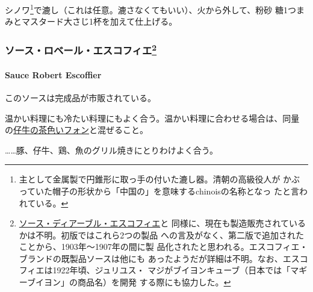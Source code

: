 シノワ\footnote{主として金属製で円錐形に取っ手の付いた漉し器。清朝の高級役人が
  かぶっていた帽子の形状から「中国の」を意味するchinoisの名称となっ
  たと言われている。}で漉し（これは任意。漉さなくてもいい）、火から外して、粉砂
糖1つまみとマスタード大さじ1杯を加えて仕上げる。

\maeaki

\hypertarget{ux30bdux30fcux30b9ux30edux30d9ux30fcux30ebux30a8ux30b9ux30b3ux30d5ux30a3ux30a879}{%
\subsubsection[ソース・ロベール・エスコフィエ]{\texorpdfstring{ソース・ロベール・エスコフィエ\footnote{\protect\hyperlink{sauce-diable-escoffier}{ソース・ディアーブル・エスコフィエ}と
  同様に、現在も製造販売されているかは不明。初版ではこれら2つの製品
  への言及がなく、第二版で追加されたことから、1903年〜1907年の間に製
  品化されたと思われる。エスコフィエ・ブランドの既製品ソースは他にも
  あったようだが詳細は不明。なお、エスコフィエは1922年頃、ジュリユス・
  マジがブイヨンキューブ（日本では「マギーブイヨン」の商品名）を開発
  する際にも協力した。}}{ソース・ロベール・エスコフィエ}}\label{ux30bdux30fcux30b9ux30edux30d9ux30fcux30ebux30a8ux30b9ux30b3ux30d5ux30a3ux30a879}}

\hypertarget{sauce-robert-escoffier}{%
\paragraph{Sauce Robert Escoffier}\label{sauce-robert-escoffier}}

 

このソースは完成品が市販されている。

温かい料理にも冷たい料理にもよく合う。温かい料理に合わせる場合は、同量
の\protect\hyperlink{fonds-de-veau-brun}{仔牛の茶色いフォン}と混ぜること。

\ldots{}\ldots{}豚、仔牛、鶏、魚のグリル焼きにとりわけよく合う。

\maeaki

